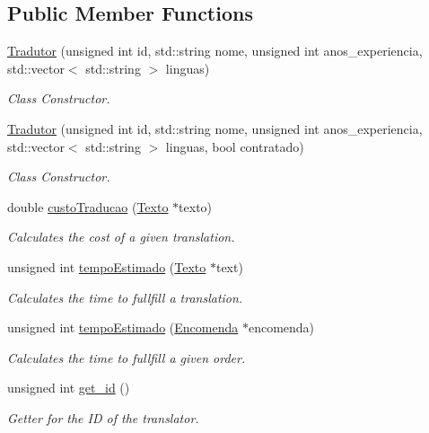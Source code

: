 \subsection*{Public Member Functions}
\begin{DoxyCompactItemize}
\item 
\hyperlink{class_tradutor_a856f362e6c97ea42d04875e6c9d012e3}{Tradutor} (unsigned int id, std\-::string nome, unsigned int anos\-\_\-experiencia, std\-::vector$<$ std\-::string $>$ linguas)
\begin{DoxyCompactList}\small\item\em Class Constructor. \end{DoxyCompactList}\item 
\hyperlink{class_tradutor_a8b918326e5d4ad49250a87dcab4de424}{Tradutor} (unsigned int id, std\-::string nome, unsigned int anos\-\_\-experiencia, std\-::vector$<$ std\-::string $>$ linguas, bool contratado)
\begin{DoxyCompactList}\small\item\em Class Constructor. \end{DoxyCompactList}\item 
double \hyperlink{class_tradutor_ab55718903fb3e7cc5c1b21b87d64393a}{custo\-Traducao} (\hyperlink{class_texto}{Texto} $\ast$texto)
\begin{DoxyCompactList}\small\item\em Calculates the cost of a given translation. \end{DoxyCompactList}\item 
unsigned int \hyperlink{class_tradutor_a1ca7c608db7e9145e8b9105e19e5900a}{tempo\-Estimado} (\hyperlink{class_texto}{Texto} $\ast$text)
\begin{DoxyCompactList}\small\item\em Calculates the time to fullfill a translation. \end{DoxyCompactList}\item 
unsigned int \hyperlink{class_tradutor_acd53cf00b851be61350100c9aa6ef3c0}{tempo\-Estimado} (\hyperlink{class_encomenda}{Encomenda} $\ast$encomenda)
\begin{DoxyCompactList}\small\item\em Calculates the time to fullfill a given order. \end{DoxyCompactList}\item 
unsigned int \hyperlink{class_tradutor_adc3d4f5ae46ebd92072c644f9fe0e479}{get\-\_\-id} ()
\begin{DoxyCompactList}\small\item\em Getter for the I\-D of the translator. \end{DoxyCompactList}\item 

\end{DoxyCompactItemize}
